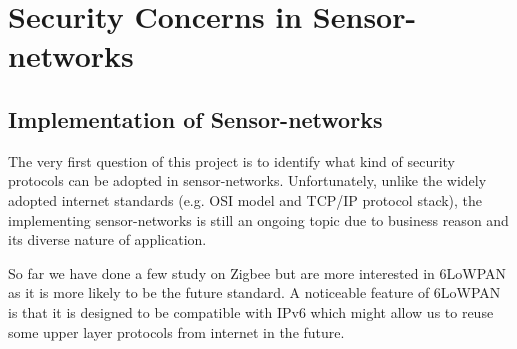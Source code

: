 \section{Security Concerns in Sensor-networks}

\subsection{Implementation of Sensor-networks}
The very first question of this project is to identify what kind of security protocols can be adopted in sensor-networks. Unfortunately,  unlike the widely adopted internet standards (e.g. OSI model\cite{OSI} and TCP/IP protocol stack), the implementing sensor-networks is still an ongoing topic due to business reason and its diverse nature of application.

So far we have done a few study on Zigbee\cite{Zigbee} but are more interested in 6LoWPAN\cite{6LoWPAN} as it is more likely to be the future standard. A noticeable feature of 6LoWPAN is that it is designed to be compatible with IPv6 which might allow us to reuse some upper layer protocols from internet in the future.

